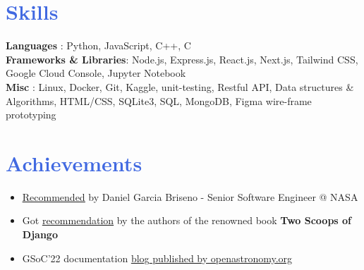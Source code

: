 \documentclass[letterpaper,11pt]{article}
\begin{document}
\vspace{-15pt}
\section{\textcolor{RoyalBlue}{Skills}}
 \begin{itemize}[leftmargin=0in, label={}]
    \small{\item{
     \textbf{Languages}              {: Python, JavaScript, C++, C} \vspace{2pt} \\
     \textbf{Frameworks \& Libraries}{: Node.js, Express.js, React.js, Next.js, Tailwind CSS, Google Cloud Console, Jupyter Notebook} \vspace{2pt} \\
     \textbf{Misc}                   {: Linux, Docker, Git, Kaggle, unit-testing, Restful API, Data structures \& Algorithms, HTML/CSS, SQLite3, SQL, MongoDB, Figma wire-frame prototyping} \vspace{2pt} \\
    }}
 \end{itemize}


\vspace{-15pt}
\section{\textcolor{RoyalBlue}{Achievements}}
    \begin{itemize}
      \item \href{https://drive.google.com/file/d/1QtL260MP5HumKJuxZ8roFU5Gdwqz-jeF/view?usp=share_link}{\underline{Recommended}} by Daniel Garcia Briseno - Senior Software Engineer @ NASA \vspace{-5pt}
      \item Got \href{https://drive.google.com/drive/folders/19GEpd9R-zwKNXO7kT5OF3pHWfL2tLkgR?usp=sharing}{\underline{recommendation}} by the authors of the renowned book \textbf{Two Scoops of Django} \vspace{-5pt}
      \item GSoC'22 documentation \href{https://openastronomy.org/Universe_OA/posts/2022/09/20220908_0520_akash5100/}{\underline{blog} published by openastronomy.org} \vspace{-5pt}
    \end{itemize}
\end{document}
